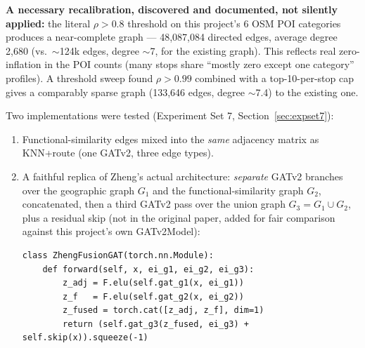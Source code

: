 \documentclass[11pt]{article}
\begin{document}
\textbf{A necessary recalibration, discovered and documented, not silently applied:} the
literal $\rho>0.8$ threshold on this project's 6 OSM POI categories produces a
near-complete graph --- 48{,}087{,}084 directed edges, average degree 2{,}680 (vs.\
$\sim$124k edges, degree $\sim$7, for the existing graph). This reflects real
zero-inflation in the POI counts (many stops share ``mostly zero except one category''
profiles). A threshold sweep found $\rho>0.99$ combined with a top-10-per-stop cap gives a
comparably sparse graph (133{,}646 edges, degree $\sim$7.4) to the existing one.

Two implementations were tested (Experiment Set 7, Section~\ref{sec:expset7}):
\begin{enumerate}
\item Functional-similarity edges mixed into the \emph{same} adjacency matrix as KNN+route
(one GATv2, three edge types).
\item A faithful replica of Zheng's actual architecture: \emph{separate} GATv2 branches over
the geographic graph $G_1$ and the functional-similarity graph $G_2$, concatenated, then a
third GATv2 pass over the union graph $G_3 = G_1 \cup G_2$, plus a residual skip (not in the
original paper, added for fair comparison against this project's own GATv2Model):
{\small\begin{verbatim}
class ZhengFusionGAT(torch.nn.Module):
    def forward(self, x, ei_g1, ei_g2, ei_g3):
        z_adj = F.elu(self.gat_g1(x, ei_g1))
        z_f   = F.elu(self.gat_g2(x, ei_g2))
        z_fused = torch.cat([z_adj, z_f], dim=1)
        return (self.gat_g3(z_fused, ei_g3) + self.skip(x)).squeeze(-1)
\end{verbatim}}
\end{enumerate}
\end{document}
